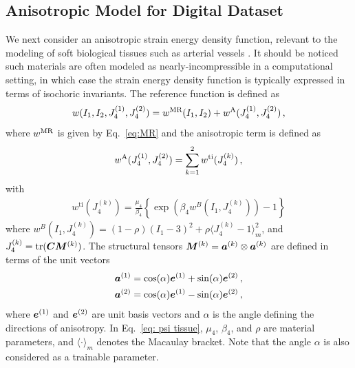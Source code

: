 \subsection{Anisotropic Model for Digital Dataset} \label{subsec:anisotropic-app}
We next consider an anisotropic strain energy density function, relevant to the modeling of soft biological tissues such as arterial vessels \cite{balzani2006polyconvex,staber2018stochastic}. It should be noticed such materials are often modeled as nearly-incompressible in a computational setting, in which case the strain energy density function is typically expressed in terms of isochoric invariants. The reference function is defined as
\begin{equation}
    w(I_1, I_2, J_4^{(1)}, J_4^{(2)}) = w{^\textnormal{MR}}(I_1,I_2) + w{^\textnormal{A}}(J_4^{(1)}, J_4^{(2)})\,,
\end{equation}
where $w{^\textnormal{MR}}$ is given by Eq.~\eqref{eq:MR} and the anisotropic term is defined as
\begin{equation}
    w{^\textnormal{A}}(J_4^{(1)}, J_4^{(2)}) = \sum_{k=1}^2 w^{\text{ti}} (J_4^{(k)})\,,
\end{equation}
with
\begin{align}
    w^{\text{ti}} (J_4^{(k)}) = \frac{\mu_4}{\beta_4} \left\{ \exp \left(\beta_4 w^B(I_1, J_4^{(k)}) \right) - 1\right\} \label{eq: psi tissue}
\end{align}
where $w^B(I_1, J_4^{(k)}) = (1-\rho)(I_1 - 3)^2 + \rho \langle J_4^{(k)} - 1 \rangle_m^2$, and $J_4^{(k)}= \operatorname{tr}(\boldsymbol{C} \boldsymbol{M}^{(k)})$. The structural tensors $\boldsymbol{M}^{(k)} = \boldsymbol{a}^{(k)} \otimes \boldsymbol{a}^{(k)}$ are defined in terms of the unit vectors 
\begin{subequations}
    \begin{align}
        \boldsymbol{a}^{(1)} &= \cos(\alpha) \boldsymbol{e}^{(1)} + \sin(\alpha)\boldsymbol{e}^{(2)}\,, \\ 
        \boldsymbol{a}^{(2)} &= \cos(\alpha) \boldsymbol{e}^{(1)} - \sin(\alpha)\boldsymbol{e}^{(2)}\,,
    \end{align}
\end{subequations}
where $\boldsymbol{e}^{(1)}$ and $\boldsymbol{e}^{(2)}$ are unit basis vectors and $\alpha$ is the angle defining the directions of anisotropy. In Eq.~\eqref{eq: psi tissue}, $\mu_4$, $\beta_4$, and $\rho$ are material parameters, and $\langle \cdot \rangle_m$ denotes the Macaulay bracket. Note that the angle $\alpha$ is also considered as a trainable parameter.

